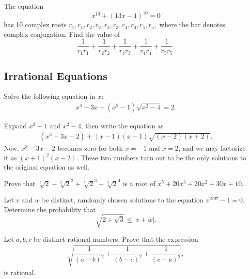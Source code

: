 \begin{question}
    The equation\[ x^{10}+(13x-1)^{10}=0 \]has 10 complex roots $r_1, \overline{r_1}, r_2, \overline{r_2}, r_3, \overline{r_3}, r_4, \overline{r_4}, r_5, \overline{r_5},$ where the bar denotes complex conjugation. Find the value of\[ \frac 1{r_1\overline{r_1}}+\frac 1{r_2\overline{r_2}}+\frac 1{r_3\overline{r_3}}+\frac 1{r_4\overline{r_4}}+\frac 1{r_5\overline{r_5}}. \]
\end{question}

\subsection{Irrational Equations}

\begin{tcolorbox}
    \begin{question}
        Solve the following equation in $x$:
        \begin{align*}
            x^3-3x+(x^2-1)\sqrt{x^2-4}=2.
        \end{align*}
    \end{question}
\end{tcolorbox}

\begin{solution}
    Expand $x^2-1$ and $x^2-4$, then write the equation as
    \begin{align*}
        (x^3-3x-2)+(x-1)(x+1)\sqrt{(x-2)(x+2)}.
    \end{align*}
    Now, $x^3-3x-2$ becomes zero for both $x=-1$ and $x=2$, and we may factorize it as $(x+1)^2(x-2)$. These two numbers turn out to be the only solutions to the original equation as well.
\end{solution}


\begin{question}
    Prove that $\sqrt[ {5}]{2}-{\sqrt[ {5}]{2}}^{2}+{\sqrt[ {5}]{2}}^{3}-{\sqrt[ {5}]{2}}^{4}$ is a root of $x^{5}+20x^{3}+20x^{2}+30x+10$.
\end{question}

\begin{question}[name={1997 Switzerland TST}]
    Let $v$ and $w$ be distinct, randomly chosen solutions to the equation $z^{1997}-1=0$. Determine the probability that \[\sqrt{2+\sqrt{3}} \leq |v+w|.\]
\end{question}


\begin{question}[name={2009 Ecuador TST}]
    Let $a,b,c$ be distinct rational numbers. Prove that the expression
    \begin{align*}
        \sqrt{\dfrac{1}{(a-b)^2}+\dfrac{1}{(b-c)^2}+\dfrac{1}{(c-a)^2}},
    \end{align*}
    is rational.
\end{question}



